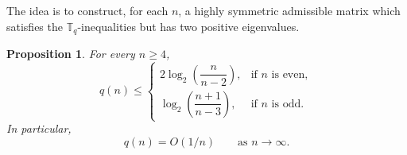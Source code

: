 \documentclass[12pt]{amsart}
\newtheorem{proposition}[theorem]{Proposition}
\theoremstyle{definition}
\newcommand{\1}{\mathbf{1}}
\newcommand\T{{\mathbb T}}
\begin{document}
The idea is to construct, for each $n$, a highly symmetric admissible matrix which
satisfies the $\T_q$-inequalities but has two positive eigenvalues. 

\begin{proposition}
\label{prop:qn-upper}
For every $n\ge 4$,
\[
q(n)\le
\begin{cases}
2\log_2\!\left(\dfrac{n}{n-2}\right), & \text{if } n \text{ is even},\\[1.25ex]
\log_2\!\left(\dfrac{n+1}{n-3}\right), & \text{if } n \text{ is odd}.
\end{cases}
\]
In particular,
\[
q(n)=O(1/n)
\qquad\text{as } n\to\infty.
\]
\end{proposition}
\end{document}
